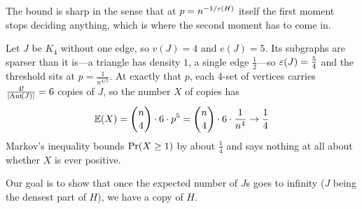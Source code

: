 The bound is sharp in the sense that at $p = n^{-1/\varepsilon(H)}$ itself the first moment stops deciding anything, which is where the second moment has to come in.

\begin{boxexample}
    Let $J$ be $K_4$ without one edge, so $v(J) = 4$ and $e(J) = 5$. Its subgraphs are sparser than it is---a triangle has density $1$, a single edge $\frac{1}{2}$---so $\varepsilon(J) = \frac{5}{4}$ and the threshold sits at $p = \frac{1}{n^{4/5}}$. At exactly that $p$, each $4$-set of vertices carries $\frac{4!}{\left\lvert \operatorname{Aut}\!\left( J \right) \right\rvert} = 6$ copies of $J$, so the number $X$ of copies has
    \begin{align*}
        \mathbb{E}(X) = \binom{n}{4} \cdot 6 \cdot p^5 = \binom{n}{4} \cdot 6 \cdot \frac{1}{n^4} \to \frac{1}{4}
    \end{align*}
    Markov's inequality bounds $\Pr\!\left( X \geq 1 \right)$ by about $\frac{1}{4}$ and says nothing at all about whether $X$ is ever positive.
\end{boxexample}

Our goal is to show that once the expected number of $J$s goes to infinity ($J$ being the densest part of $H$), we have a copy of $H$.
